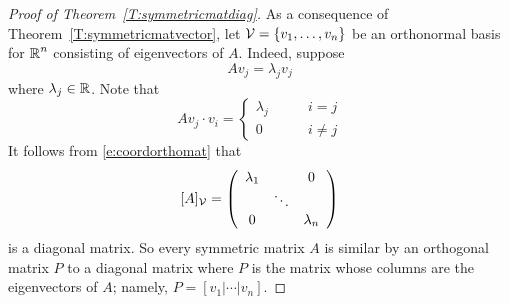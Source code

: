 \documentclass{ximera}
\begin{document}

\begin{proof}[Proof of Theorem~\ref{T:symmetricmatdiag}]
As a consequence of Theorem~\ref{T:symmetricmatvector}, let
${\cal V}=\{v_1,\ldots,v_n\}$ be an orthonormal basis for $\mbox{$\Bbb{R}$}^n$
consisting of eigenvectors of $A$.  Indeed, suppose
\[
Av_j = \lambda_jv_j
\]
where $\lambda_j\in\mbox{$\Bbb{R}$}$.  Note that
\[
Av_j\cdot v_i =  \left\{\begin{array}{rl} \lambda_j & \qquad i=j\\
			0 & \qquad i\neq j \end{array}\right.
\]
It follows from \eqref{e:coordorthomat} that
\[
[A]_{\cal V}= \left(\begin{array}{ccc} \lambda_1 & & 0 \\  & \ddots & \\
	0 &  & \lambda_n \end{array}\right)
\]
is a diagonal matrix.  So every symmetric matrix $A$ is similar by 
an orthogonal matrix $P$ to a diagonal
matrix where $P$ is the matrix whose columns are the eigenvectors of $A$; 
namely, $P = [v_1|\cdots|v_n]$.  \end{proof}







\end{document}
